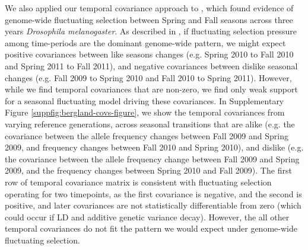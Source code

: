 \documentclass[11pt]{article}
\begin{document}
We also applied our temporal covariance approach to \textcite{Bergland2014-ij},
which found evidence of genome-wide fluctuating selection between Spring and
Fall seasons across three years \emph{Drosophila melanogaster}. As described in
\textcite{Buffalo2019-io}, if fluctuating selection pressure among time-periods
are the dominant genome-wide pattern, we might expect positive covariances
between like seasons changes (e.g. Spring 2010 to Fall 2010 and Spring
2011 to Fall 2011), and negative covariances between dislike seasonal changes
(e.g. Fall 2009 to Spring 2010 and Fall 2010 to Spring 2011). However,
while we find temporal covariances that are non-zero, we find only weak support
for a seasonal fluctuating model driving these covariances. In Supplementary
Figure \ref{suppfig:bergland-covs-figure}, we show the temporal covariances
from varying reference generations, across seasonal transitions that are alike
(e.g.  the covariance between the allele frequency changes between Fall 2009
and Spring 2009, and frequency changes between Fall 2010 and Spring 2010), and
dislike (e.g. the covariance between the allele frequency change between Fall
2009 and Spring 2009, and the frequency changes between Spring 2010 and Fall
2009). The first row of temporal covariance matrix is consistent with
fluctuating selection operating for two timepoints, as the first covariance is
negative, and the second is positive, and later covariances are not
statistically differentiable from zero (which could occur if LD and additive
genetic variance decay). However, the all other temporal covariances do not fit
the pattern we would expect under genome-wide fluctuating selection.
\end{document}
